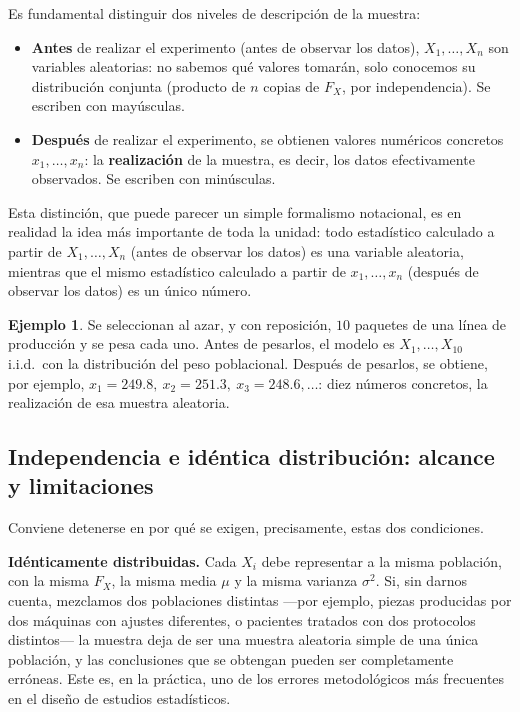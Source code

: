 \documentclass[11pt,a4paper]{article}
\theoremstyle{plain}
\theoremstyle{definition}
\newtheorem{ejemplo}[teorema]{Ejemplo}
\theoremstyle{remark}
\begin{document}
Es fundamental distinguir dos niveles de descripción de la muestra:

\begin{itemize}
\item \textbf{Antes} de realizar el experimento (antes de observar los datos), $X_1,\dots,X_n$ son variables aleatorias: no sabemos qué valores tomarán, solo conocemos su distribución conjunta (producto de $n$ copias de $F_X$, por independencia). Se escriben con mayúsculas.
\item \textbf{Después} de realizar el experimento, se obtienen valores numéricos concretos $x_1,\dots,x_n$: la \textbf{realización} de la muestra, es decir, los datos efectivamente observados. Se escriben con minúsculas.
\end{itemize}

Esta distinción, que puede parecer un simple formalismo notacional, es en realidad la idea más importante de toda la unidad: todo estadístico calculado a partir de $X_1,\dots,X_n$ (antes de observar los datos) es una variable aleatoria, mientras que el mismo estadístico calculado a partir de $x_1,\dots,x_n$ (después de observar los datos) es un único número.

\begin{ejemplo}
Se seleccionan al azar, y con reposición, $10$ paquetes de una línea de producción y se pesa cada uno. Antes de pesarlos, el modelo es $X_1,\dots,X_{10}$ i.i.d.\ con la distribución del peso poblacional. Después de pesarlos, se obtiene, por ejemplo, $x_1=249.8,\ x_2=251.3,\ x_3=248.6,\dots$: diez números concretos, la realización de esa muestra aleatoria.
\end{ejemplo}

\subsection{Independencia e idéntica distribución: alcance y limitaciones}

Conviene detenerse en por qué se exigen, precisamente, estas dos condiciones.

\textbf{Idénticamente distribuidas.} Cada $X_i$ debe representar a la misma población, con la misma $F_X$, la misma media $\mu$ y la misma varianza $\sigma^2$. Si, sin darnos cuenta, mezclamos dos poblaciones distintas —por ejemplo, piezas producidas por dos máquinas con ajustes diferentes, o pacientes tratados con dos protocolos distintos— la muestra deja de ser una muestra aleatoria simple de una única población, y las conclusiones que se obtengan pueden ser completamente erróneas. Este es, en la práctica, uno de los errores metodológicos más frecuentes en el diseño de estudios estadísticos.
\end{document}
